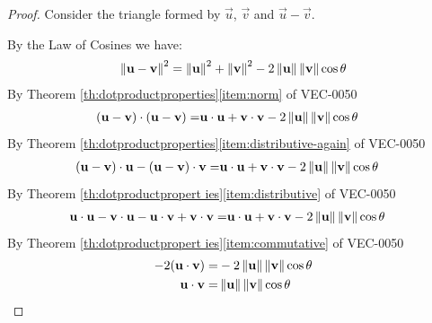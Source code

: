 \documentclass{ximera}
\begin{document}
\begin{proof} Consider the triangle formed by $\vec{u}$, $\vec{v}$ and $\vec{u}-\vec{v}$. 

\begin{center}
\end{center}

By the Law of Cosines we have:
\begin{align*}
\left\lVert\mathbf{u}-\mathbf{v}\right\rVert^2=\left\lVert\mathbf{u}\right\rVert^2+\left\lVert\mathbf{v}\right\rVert^2-2\left\lVert\mathbf{u}\right\rVert\left\lVert\mathbf{v}\right\rVert\cos\theta
\end{align*}
By Theorem \ref{th:dotproductproperties}\ref{item:norm} of VEC-0050
\begin{align*}
(\mathbf{u}-\mathbf{v})\cdot (\mathbf{u}-\mathbf{v})=&\mathbf{u}\cdot \mathbf{u}+\mathbf{v}\cdot \mathbf{v}-2\left\lVert\mathbf{u}\right\rVert\left\lVert\mathbf{v}\right\rVert\cos\theta
\end{align*}
By Theorem \ref{th:dotproductproperties}\ref{item:distributive-again} of VEC-0050
\begin{align*}
(\mathbf{u}-\mathbf{v})\cdot \mathbf{u}-(\mathbf{u}-\mathbf{v})\cdot \mathbf{v}=&\mathbf{u}\cdot \mathbf{u}+\mathbf{v}\cdot \mathbf{v}-2\left\lVert\mathbf{u}\right\rVert\left\lVert\mathbf{v}\right\rVert\cos\theta
\end{align*}
By Theorem \ref{th:dotproductpropert ies}\ref{item:distributive} of VEC-0050
\begin{align*}
\mathbf{u}\cdot \mathbf{u}-\mathbf{v}\cdot\mathbf{u}-\mathbf{u}\cdot\mathbf{v}+\mathbf{v}\cdot \mathbf{v}=&\mathbf{u}\cdot \mathbf{u}+\mathbf{v}\cdot \mathbf{v}-2\left\lVert\mathbf{u}\right\rVert\left\lVert\mathbf{v}\right\rVert\cos\theta
\end{align*}
By Theorem \ref{th:dotproductpropert ies}\ref{item:commutative} of VEC-0050
\begin{align*}
-2(\mathbf{u}\cdot \mathbf{v})=&-2\left\lVert\mathbf{u}\right\rVert\left\lVert\mathbf{v}\right\rVert\cos\theta\\
\mathbf{u}\cdot \mathbf{v}=&\left\lVert\mathbf{u}\right\rVert\left\lVert\mathbf{v}\right\rVert\cos\theta
\end{align*}
\end{proof}
\end{document}
